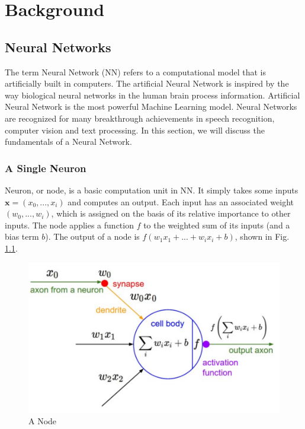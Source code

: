 \chapter{Background} 
\label{background} 

\section{Neural Networks}

The term Neural Network (NN) refers to a computational model that is artificially built in computers. The artificial Neural Network is inspired by the way biological neural networks in the human brain process information. Artificial Neural Network is the most powerful Machine Learning model. Neural Networks are recognized for many breakthrough achievements in speech recognition, computer vision and text processing. In this section, we will discuss the fundamentals of a Neural Network.

\subsection{A Single Neuron}
Neuron, or node, is a basic computation unit in NN. It simply takes some inputs $\mathbf{x} = (x_0,...,x_i)$ and computes an output. Each input has an associated weight $(w_0,...,w_i)$, which is assigned on the basis of its relative importance to other inputs. The node applies a function $f$ to the weighted sum of its inputs (and a bias term $b$). The output of a node is $f(w_1x_1 +...+ w_ix_i + b)$, shown in Fig.\,\ref{node}.
\begin{figure}
	\centering
	\includegraphics[scale=0.5]{Figs/node.png}
    \caption{A Node}
    \label{node}
\end{figure}

